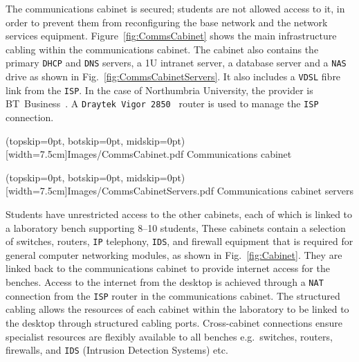 \documentclass{ieeeaccess}
\begin{document}
The communications cabinet is secured; students are not allowed access to it,
in order to prevent them from reconfiguring the base network and the network
services equipment. Figure~\ref{fig:CommsCabinet} shows the main infrastructure
cabling within the communications cabinet.  The cabinet also contains the
primary \texttt{DHCP} and \texttt{DNS} servers, a 1U intranet server, a
database server and a \texttt{NAS} drive as shown in
Fig.~\ref{fig:CommsCabinetServers}. It also includes a \texttt{VDSL} fibre link
from the \texttt{ISP}. In the case of Northumbria University, the provider is
BT~Business~\cite{BT:17}. A \texttt{Draytek Vigor 2850}~\cite{DC:17} router is
used to manage the \texttt{ISP} connection. 

\Figure[t!](topskip=0pt, botskip=0pt, midskip=0pt)[width=7.5cm]{Images/CommsCabinet.pdf}
{Communications cabinet\label{fig:CommsCabinet}}

\Figure[t!](topskip=0pt, botskip=0pt, midskip=0pt)[width=7.5cm]{Images/CommsCabinetServers.pdf}
{Communications cabinet servers\label{fig:CommsCabinetServers}}


Students have unrestricted access to the other cabinets, each of which is
linked to a laboratory bench supporting 8--10 students, These cabinets contain
a selection of switches, routers, \texttt{IP} telephony, \texttt{IDS}, and
firewall equipment that is required for general computer networking modules, as
shown in Fig.~\ref{fig:Cabinet}.  They are linked back to the communications
cabinet to provide internet access for the benches. Access to the internet from
the desktop is achieved through a \texttt{NAT} connection from the \texttt{ISP}
router in the communications cabinet.  The structured cabling allows the
resources of each cabinet within the laboratory to be linked to the desktop
through structured cabling ports.  Cross-cabinet connections ensure specialist
resources are flexibly available to all benches e.g.\ switches, routers,
firewalls, and \texttt{IDS} (Intrusion Detection Systems) etc.
\end{document}
